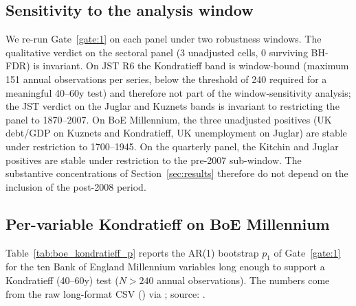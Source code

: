 \subsection{Sensitivity to the analysis window}

We re-run Gate~\ref{gate:1} on each panel under two robustness
windows. The qualitative verdict on the sectoral panel
(3 unadjusted cells, 0 surviving BH-FDR) is invariant. On JST R6
the Kondratieff band is window-bound (maximum 151 annual
observations per series, below the threshold of 240 required for
a meaningful 40--60y test) and therefore not part of the
window-sensitivity analysis; the JST verdict on the Juglar and
Kuznets bands is invariant to restricting the panel to 1870--2007.
On BoE Millennium, the three unadjusted positives
(UK debt/GDP on Kuznets and Kondratieff, UK unemployment on
Juglar) are stable under restriction to 1700--1945. On the
quarterly panel, the Kitchin and Juglar positives are stable
under restriction to the pre-2007 sub-window. The substantive
concentrations of Section~\ref{sec:results} therefore do not
depend on the inclusion of the post-2008 period.

\subsection{Per-variable Kondratieff on BoE Millennium}

Table~\ref{tab:boe_kondratieff_p} reports the AR(1) bootstrap
\(p_1\) of Gate~\ref{gate:1} for the ten Bank of England
Millennium variables long enough to support a Kondratieff
(40--60y) test (\(N>240\) annual observations). The numbers
come from the raw long-format CSV
() via
; source:
.

